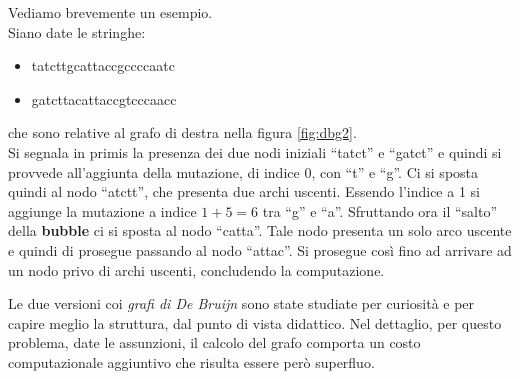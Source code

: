 \documentclass[a4paper,12pt, oneside]{book}
\begin{document}
\begin{esempio}
  Vediamo brevemente un esempio.\\
  Siano date le stringhe:
  \begin{itemize}
    \item tatcttgcattaccgccccaatc
    \item gatcttacattaccgtcccaacc
  \end{itemize}
  che sono relative al grafo di destra nella figura \ref{fig:dbg2}.\\
  Si segnala in primis la presenza dei due nodi iniziali ``tatct'' e ``gatct'' e
  quindi si provvede all'aggiunta della mutazione, di indice 0, con ``t'' e
  ``g''. Ci si sposta quindi al nodo ``atctt'', che presenta due archi
  uscenti. Essendo l'indice a 1 si aggiunge la mutazione a indice $1+5=6$ tra
  ``g'' e ``a''. Sfruttando ora il ``salto'' della \textbf{bubble} ci si sposta
  al nodo ``catta''. Tale nodo presenta un solo arco uscente e quindi di
  prosegue passando al nodo ``attac''. Si prosegue così fino ad arrivare ad un
  nodo privo di archi uscenti, concludendo la computazione.
\end{esempio}
\noindent
Le due versioni coi \textit{grafi di De Bruijn} sono state studiate per
curiosità e per capire meglio la struttura, dal punto di vista didattico. Nel
dettaglio, per questo problema, 
date le assunzioni, il calcolo del grafo comporta un costo computazionale
aggiuntivo che risulta essere però superfluo.
\end{document}
